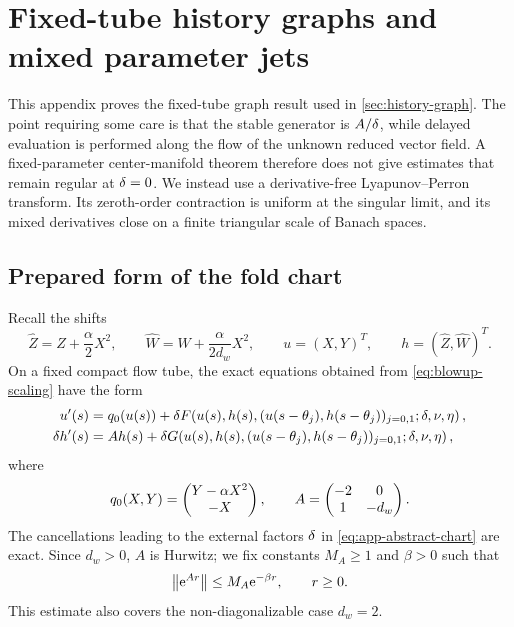 \section{Fixed-tube history graphs and mixed parameter jets}
\label{app:compact-graph-jets}
\label{app:compact-graph}

This appendix proves the fixed-tube graph result used in
\cref{sec:history-graph}.  The point requiring some care is that the stable
generator is \(A/\delta\), while delayed evaluation is performed along the
flow of the unknown reduced vector field.  A fixed-parameter center-manifold
theorem therefore does not give estimates that remain regular at
\(\delta=0\).  We instead use a derivative-free Lyapunov--Perron transform.
Its zeroth-order contraction is uniform at the singular limit, and its
mixed derivatives close on a finite triangular scale of Banach spaces.

\subsection{Prepared form of the fold chart}
\label{app:compact-graph-setting}

Recall the shifts
\begin{equation}
\label{eq:app-stable-shifts}
 \widehat Z=Z+\frac{\alpha}{2}X^2,
 \qquad
 \widehat W=W+\frac{\alpha}{2d_w}X^2,
 \qquad
 u=(X,Y)^T,
 \qquad
 h=(\widehat Z,\widehat W)^T.
\end{equation}
On a fixed compact flow tube, the exact equations obtained from
\cref{eq:blowup-scaling} have the form
\begin{equation}
\label{eq:app-abstract-chart}
\begin{aligned}
 u'(s)&=q_0(u(s))
 +\delta F\!\left(u(s),h(s),
       (u(s-\theta_j),h(s-\theta_j))_{j=0,1};
       \delta,\nu,\eta\right),\\
 \delta h'(s)&=Ah(s)
 +\delta G\!\left(u(s),h(s),
       (u(s-\theta_j),h(s-\theta_j))_{j=0,1};
       \delta,\nu,\eta\right),
\end{aligned}
\end{equation}
where
\begin{equation}
\label{eq:app-q0-A}
 q_0(X,Y)=\begin{pmatrix}Y-\alpha X^2\\-X\end{pmatrix},
 \qquad
 A=\begin{pmatrix}-2&0\\1&-d_w\end{pmatrix}.
\end{equation}
The cancellations leading to the external factors \(\delta\) in
\cref{eq:app-abstract-chart} are exact.  Since \(d_w>0\), \(A\) is Hurwitz;
we fix constants \(M_A\geq1\) and \(\beta>0\) such that
\begin{equation}
\label{eq:app-stable-semigroup}
 \left\lVert \mathrm e^{Ar}\right\rVert\leq M_A\mathrm e^{-\beta r},
 \qquad r\geq0.
\end{equation}
This estimate also covers the non-diagonalizable case \(d_w=2\).

